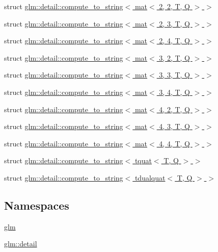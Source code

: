 \begin{DoxyCompactItemize}
\item 
struct \hyperlink{structglm_1_1detail_1_1compute__to__string_3_01mat_3_012_00_012_00_01_t_00_01_q_01_4_01_4}{glm\+::detail\+::compute\+\_\+to\+\_\+string$<$ mat$<$ 2, 2, T, Q $>$ $>$}
\item 
struct \hyperlink{structglm_1_1detail_1_1compute__to__string_3_01mat_3_012_00_013_00_01_t_00_01_q_01_4_01_4}{glm\+::detail\+::compute\+\_\+to\+\_\+string$<$ mat$<$ 2, 3, T, Q $>$ $>$}
\item 
struct \hyperlink{structglm_1_1detail_1_1compute__to__string_3_01mat_3_012_00_014_00_01_t_00_01_q_01_4_01_4}{glm\+::detail\+::compute\+\_\+to\+\_\+string$<$ mat$<$ 2, 4, T, Q $>$ $>$}
\item 
struct \hyperlink{structglm_1_1detail_1_1compute__to__string_3_01mat_3_013_00_012_00_01_t_00_01_q_01_4_01_4}{glm\+::detail\+::compute\+\_\+to\+\_\+string$<$ mat$<$ 3, 2, T, Q $>$ $>$}
\item 
struct \hyperlink{structglm_1_1detail_1_1compute__to__string_3_01mat_3_013_00_013_00_01_t_00_01_q_01_4_01_4}{glm\+::detail\+::compute\+\_\+to\+\_\+string$<$ mat$<$ 3, 3, T, Q $>$ $>$}
\item 
struct \hyperlink{structglm_1_1detail_1_1compute__to__string_3_01mat_3_013_00_014_00_01_t_00_01_q_01_4_01_4}{glm\+::detail\+::compute\+\_\+to\+\_\+string$<$ mat$<$ 3, 4, T, Q $>$ $>$}
\item 
struct \hyperlink{structglm_1_1detail_1_1compute__to__string_3_01mat_3_014_00_012_00_01_t_00_01_q_01_4_01_4}{glm\+::detail\+::compute\+\_\+to\+\_\+string$<$ mat$<$ 4, 2, T, Q $>$ $>$}
\item 
struct \hyperlink{structglm_1_1detail_1_1compute__to__string_3_01mat_3_014_00_013_00_01_t_00_01_q_01_4_01_4}{glm\+::detail\+::compute\+\_\+to\+\_\+string$<$ mat$<$ 4, 3, T, Q $>$ $>$}
\item 
struct \hyperlink{structglm_1_1detail_1_1compute__to__string_3_01mat_3_014_00_014_00_01_t_00_01_q_01_4_01_4}{glm\+::detail\+::compute\+\_\+to\+\_\+string$<$ mat$<$ 4, 4, T, Q $>$ $>$}
\item 
struct \hyperlink{structglm_1_1detail_1_1compute__to__string_3_01tquat_3_01_t_00_01_q_01_4_01_4}{glm\+::detail\+::compute\+\_\+to\+\_\+string$<$ tquat$<$ T, Q $>$ $>$}
\item 
struct \hyperlink{structglm_1_1detail_1_1compute__to__string_3_01tdualquat_3_01_t_00_01_q_01_4_01_4}{glm\+::detail\+::compute\+\_\+to\+\_\+string$<$ tdualquat$<$ T, Q $>$ $>$}
\end{DoxyCompactItemize}
\subsection*{Namespaces}
\begin{DoxyCompactItemize}
\item 
 \hyperlink{namespaceglm}{glm}
\item 
 \hyperlink{namespaceglm_1_1detail}{glm\+::detail}
\end{DoxyCompactItemize}
